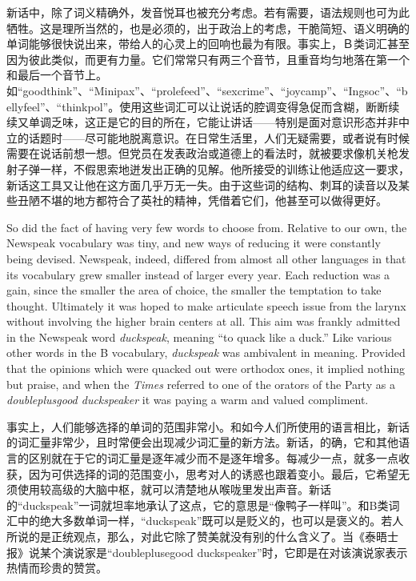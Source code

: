 \begin{paracol}{2}
\switchcolumn

新话中，除了词义精确外，发音悦耳也被充分考虑。若有需要，语法规则也可为此牺牲。这是理所当然的，也是必须的，出于政治上的考虑，干脆简短、语义明确的单词能够很快说出来，带给人的心灵上的回响也最为有限。事实上，Ｂ类词汇甚至因为彼此类似，而更有力量。它们常常只有两三个音节，且重音均匀地落在第一个和最后一个音节上。如``goodthink''、``Minipax''、``prolefeed''、``sexcrime''、``joycamp''、``Ingsoc''、``bellyfeel''、``thinkpol''。使用这些词汇可以让说话的腔调变得急促而含糊，断断续续又单调乏味，这正是它的目的所在，它能让讲话——特别是面对意识形态并非中立的话题时——尽可能地脱离意识。在日常生活里，人们无疑需要，或者说有时候需要在说话前想一想。但党员在发表政治或道德上的看法时，就被要求像机关枪发射子弹一样，不假思索地迸发出正确的见解。他所接受的训练让他适应这一要求，新话这工具又让他在这方面几乎万无一失。由于这些词的结构、刺耳的读音以及某些丑陋不堪的地方都符合了英社的精神，凭借着它们，他甚至可以做得更好。

\switchcolumn*

So did the fact of having very few words to choose from. Relative to our
own, the Newspeak vocabulary was tiny, and new ways of reducing it were
constantly being devised. Newspeak, indeed, differed from almost all
other languages in that its vocabulary grew smaller instead of larger
every year. Each reduction was a gain, since the smaller the area of
choice, the smaller the temptation to take thought. Ultimately it was
hoped to make articulate speech issue from the larynx without involving
the higher brain centers at all. This aim was frankly admitted in the
Newspeak word \emph{duckspeak}, meaning ``to quack like a duck.'' Like
various other words in the B vocabulary, \emph{duckspeak} was ambivalent
in meaning. Provided that the opinions which were quacked out were
orthodox ones, it implied nothing but praise, and when the \emph{Times}
referred to one of the orators of the Party as a \emph{doubleplusgood
duckspeaker} it was paying a warm and valued compliment.

\switchcolumn

事实上，人们能够选择的单词的范围非常小。和如今人们所使用的语言相比，新话的词汇量非常少，且时常便会出现减少词汇量的新方法。新话，的确，它和其他语言的区别就在于它的词汇量是逐年减少而不是逐年增多。每减少一点，就多一点收获，因为可供选择的词的范围变小，思考对人的诱惑也跟着变小。最后，它希望无须使用较高级的大脑中枢，就可以清楚地从喉咙里发出声音。新话的``duckspeak''一词就坦率地承认了这点，它的意思是``像鸭子一样叫''。和B类词汇中的绝大多数单词一样，``duckspeak''既可以是贬义的，也可以是褒义的。若人所说的是正统观点，那么，对此它除了赞美就没有别的什么含义了。当《泰晤士报》说某个演说家是``doubleplusegood
duckspeaker''时，它即是在对该演说家表示热情而珍贵的赞赏。


\end{paracol}
